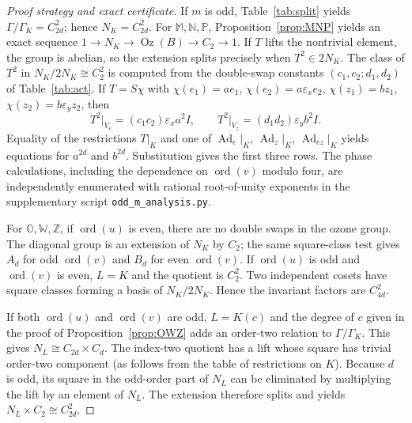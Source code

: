 \begin{proof}[Proof strategy and exact certificate]
If $m$ is odd, Table~\ref{tab:split} yields
$\Gamma/\Gamma_K=C_{2d}^2$; hence $N_K=C_{2d}^2$.
For $\mathbb M,\mathbb N,\mathbb P$, Proposition~\ref{prop:MNP} yields an exact sequence
$1\to N_K\to\operatorname{Oz}(B)\to C_2\to1$.
If $T$ lifts the nontrivial element, the group is abelian, so the extension
splits precisely when $T^2\in 2N_K$. The class of $T^2$ in
$N_K/2N_K\cong C_2^2$ is computed from the double-swap constants
$(c_1,c_2;d_1,d_2)$ of Table~\ref{tab:act}. If $T=S\chi$ with
$\chi(e_1)=a e_1$, $\chi(e_2)=a\varepsilon_xe_2$,
$\chi(z_1)=bz_1$, $\chi(z_2)=b\varepsilon_yz_2$, then
\[
 T^2\big|_{V_e}=(c_1c_2)\varepsilon_xa^2 I,
 \qquad T^2\big|_{V_z}=(d_1d_2)\varepsilon_yb^2 I.
\]
Equality of the restrictions $T|_K$ and one of
$\operatorname{Ad}_e|_K$, $\operatorname{Ad}_z|_K$,
$\operatorname{Ad}_{ez}|_K$ yields equations for
$a^{2d}$ and $b^{2d}$. Substitution gives the first three rows.
The phase calculations, including the dependence on $\operatorname{ord}(v)$
modulo four, are independently enumerated with rational root-of-unity
exponents in the supplementary script \texttt{odd\_m\_analysis.py}.

For $\mathbb O,\mathbb W,\mathbb Z$, if $\operatorname{ord}(u)$ is even,
there are no double swaps in the ozone group. The diagonal group is an
extension of $N_K$ by $C_2$; the same square-class test gives $A_d$
for odd $\operatorname{ord}(v)$ and $B_d$ for even $\operatorname{ord}(v)$.
If $\operatorname{ord}(u)$ is odd and $\operatorname{ord}(v)$ is even,
$L=K$ and the quotient is $C_2^2$. Two independent cosets have square
classes forming a basis of $N_K/2N_K$. Hence the invariant factors are
$C_{4d}^2$.

If both $\operatorname{ord}(u)$ and $\operatorname{ord}(v)$ are odd,
$L=K(c)$ and the degree of $c$ given in the proof of
Proposition~\ref{prop:OWZ} adds an order-two relation to
$\Gamma/\Gamma_K$. This gives
$N_L\cong C_{2d}\times C_d$. The index-two quotient has a lift whose
square has trivial order-two component (as follows from the table of
restrictions on $K$). Because $d$ is odd, its square in the odd-order
part of $N_L$ can be eliminated by multiplying the lift by an element
of $N_L$. The extension therefore splits and yields
$N_L\times C_2\cong C_{2d}^2$.
\end{proof}
